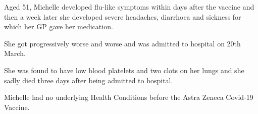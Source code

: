Aged 51, Michelle developed flu-like symptoms within days after the vaccine and
then a week later she developed severe headaches, diarrhoea and sickness for
which her GP gave her medication.

She got progressively worse and worse and was admitted to hospital on 20th
March.

She was found to have low blood platelets and two clots on her lungs and she
sadly died three days after being admitted to hospital.

Michelle had no underlying Health Conditions before the Astra Zeneca Covid-19
Vaccine.

